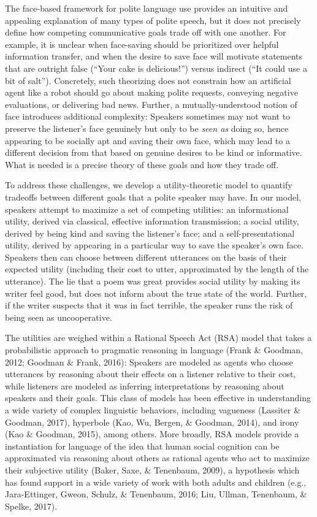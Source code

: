 \documentclass[floatsintext,mask,man]{apa6}
\theoremstyle{definition}
\theoremstyle{definition}
\theoremstyle{definition}
\theoremstyle{remark}
\begin{document}
The face-based framework for polite language use provides an intuitive
and appealing explanation of many types of polite speech, but it does
not precisely define how competing communicative goals trade off with
one another. For example, it is unclear when face-saving should be
prioritized over helpful information transfer, and when the desire to
save face will motivate statements that are outright false
(\enquote{Your cake is delicious!}) versus indirect (\enquote{It could
use a bit of salt}). Concretely, such theorizing does not constrain how
an artificial agent like a robot should go about making polite requests,
conveying negative evaluations, or delivering bad news. Further, a
mutually-understood notion of face introduces additional complexity:
Speakers sometimes may not want to preserve the listener's face
genuinely but only to be \emph{seen as} doing so, hence appearing to be
socially apt and saving their own face, which may lead to a different
decision from that based on genuine desires to be kind or informative.
What is needed is a precise theory of these goals and how they trade
off.

To address these challenges, we develop a utility-theoretic model to
quantify tradeoffs between different goals that a polite speaker may
have. In our model, speakers attempt to maximize a set of competing
utilities: an informational utility, derived via classical, effective
information transmission; a social utility, derived by being kind and
saving the listener's face; and a self-presentational utility, derived
by appearing in a particular way to save the speaker's own face.
Speakers then can choose between different utterances on the basis of
their expected utility (including their cost to utter, approximated by
the length of the utterance). The lie that a poem was great provides
social utility by making its writer feel good, but does not inform about
the true state of the world. Further, if the writer suspects that it was
in fact terrible, the speaker runs the risk of being seen as
uncooperative.

The utilities are weighed within a Rational Speech Act (RSA) model that
takes a probabilistic approach to pragmatic reasoning in language (Frank
\& Goodman, 2012; Goodman \& Frank, 2016): Speakers are modeled as
agents who choose utterances by reasoning about their effects on a
listener relative to their cost, while listeners are modeled as
inferring interpretations by reasoning about speakers and their goals.
This class of models has been effective in understanding a wide variety
of complex linguistic behaviors, including vagueness (Lassiter \&
Goodman, 2017), hyperbole (Kao, Wu, Bergen, \& Goodman, 2014), and irony
(Kao \& Goodman, 2015), among others. More broadly, RSA models provide a
instantiation for language of the idea that human social cognition can
be approximated via reasoning about others as rational agents who act to
maximize their subjective utility (Baker, Saxe, \& Tenenbaum, 2009), a
hypothesis which has found support in a wide variety of work with both
adults and children (e.g., Jara-Ettinger, Gweon, Schulz, \& Tenenbaum,
2016; Liu, Ullman, Tenenbaum, \& Spelke, 2017).
\end{document}
